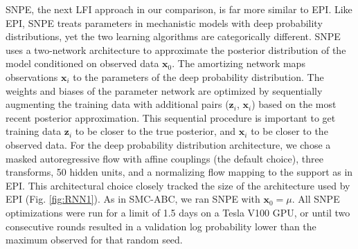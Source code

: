 \documentclass[11pt]{article}
\begin{document}
SNPE, the next LFI approach in our comparison, is far more similar to EPI.
Like EPI, SNPE treats parameters in mechanistic models with deep probability distributions, yet the two learning algorithms are categorically different.
SNPE uses a two-network architecture to approximate the posterior distribution of the model conditioned on observed data $\mathbf{x}_0$.
The amortizing network maps observations $\mathbf{x}_i$ to the parameters of the deep probability distribution. 
The weights and biases of the parameter network are optimized by sequentially augmenting the training data with additional pairs ($\mathbf{z}_i$, $\mathbf{x}_i$) based on the most recent posterior approximation.
This sequential procedure is important to get training data $\mathbf{z}_i$ to be closer to the true posterior, and $\mathbf{x}_i$ to be closer to the observed data.
For the deep probability distribution architecture, we chose a masked autoregressive flow with affine couplings (the default choice), three transforms, 50 hidden units, and a normalizing flow mapping to the support as in EPI.
This architectural choice closely tracked the size of the architecture used by EPI (Fig. \ref{fig:RNN1}).
As in SMC-ABC, we ran SNPE with $\mathbf{x}_0 = \mu$.
All SNPE optimizations were run for a limit of 1.5 days on a Tesla V100 GPU, or until two consecutive rounds resulted in a validation log probability lower than the maximum observed for that random seed.
\end{document}
